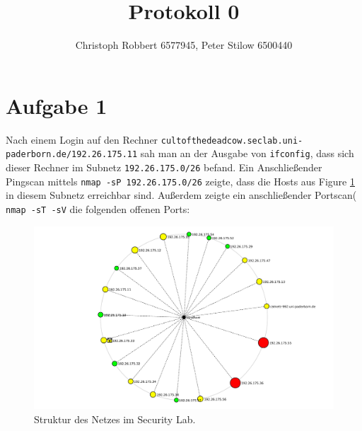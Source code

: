 \documentclass[10pt,a4paper]{article}
\author{Christoph Robbert 6577945, Peter Stilow 6500440}
\title{Protokoll 0}
\begin{document}
\maketitle
 
\section{Aufgabe 1}
Nach einem Login auf den Rechner \texttt{cultofthedeadcow.seclab.uni-paderborn.de/192.26.175.11} sah man an der Ausgabe von \texttt{ifconfig}, dass sich dieser Rechner im Subnetz \texttt{192.26.175.0/26} befand.
Ein Anschließender Pingscan mittels \texttt{nmap -sP 192.26.175.0/26} zeigte, dass die Hosts aus Figure \ref{0_netlayout} in diesem Subnetz erreichbar sind.
Außerdem zeigte ein anschließender Portscan( \texttt{nmap -sT -sV} die folgenden offenen Ports:
\begin{figure}
\label{0_netlayout}
\includegraphics[scale=0.4]{figures/0_netlayout.pdf}
\caption{Struktur des Netzes im Security Lab.}
\end{figure}
\end{document}
